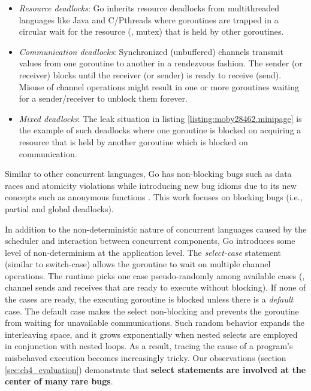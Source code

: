 \begin{itemize}
  \item \textit{Resource deadlocks}: Go inherits resource deadlocks from multithreaded languages like Java and C/Pthreads where goroutines are trapped in a circular wait for the resource (\eg, mutex) that is held by other goroutines.
  \item \textit{Communication deadlocks}: Synchronized (unbuffered) channels transmit values from one goroutine to another in a rendezvous fashion. The sender (or receiver) blocks until the receiver (or sender) is ready to receive (send). Misuse of channel operations might result in one or more goroutines waiting for a sender/receiver to unblock them forever.
  \item \textit{Mixed deadlocks}: The leak situation in listing \ref{listing:moby28462.minipage} is the example of such deadlocks where one goroutine is blocked on acquiring a resource that is held by another goroutine which is blocked on communication.
\end{itemize}

Similar to other concurrent languages, Go has non-blocking bugs such as data races and atomicity violations while introducing new bug idioms due to its new concepts such as anonymous functions \cite{tu-concurrentBugs-asplos19}.
%
This work focuses on blocking bugs (i.e., partial and global deadlocks).

In addition to the non-deterministic nature of concurrent languages caused by the scheduler and interaction between concurrent components, Go introduces some level of non-determinism at the application level.
%
The \textit{select-case} statement (similar to switch-case) allows the goroutine to wait on multiple channel operations.
%
The runtime picks one case pseudo-randomly among available cases (\ie, channel sends and receives that are ready to execute without blocking).
%
If none of the cases are ready, the executing goroutine is blocked unless there is a \textit{default} case.
%
The default case makes the select non-blocking and prevents the goroutine from waiting for unavailable communications.
%
Such random behavior expands the interleaving space, and it grows exponentially when nested selects are employed in conjunction with nested loops.
%
As a result, tracing the cause of a program's misbehaved execution becomes increasingly tricky.
%
Our observations (section \ref{sec:ch4_evaluation}) demonstrate that \textbf{select statements are involved at the center of many rare bugs}.


